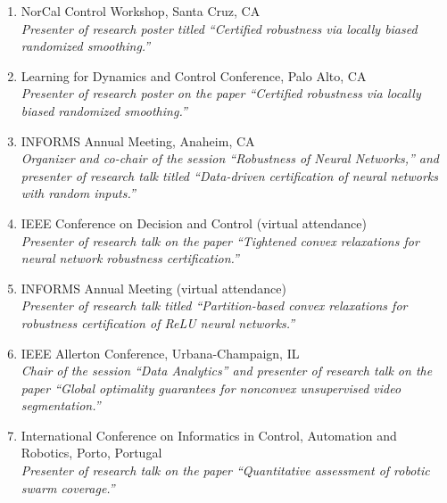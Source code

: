 \begin{enumerate}[label={\arabic*.}]
	\item NorCal Control Workshop, Santa Cruz, CA  \\
	\textit{Presenter of research poster titled ``Certified robustness via locally biased randomized smoothing.''}
	\item Learning for Dynamics and Control Conference, Palo Alto, CA  \\
	\textit{Presenter of research poster on the paper ``Certified robustness via locally biased randomized smoothing.''}
	\item INFORMS Annual Meeting, Anaheim, CA  \\
	\textit{Organizer and co-chair of the session ``Robustness of Neural Networks,'' and presenter of research talk titled ``Data-driven certification of neural networks with random inputs.''}
	\item IEEE Conference on Decision and Control (virtual attendance)  \\
	\textit{Presenter of research talk on the paper ``Tightened convex relaxations for neural network robustness certification.''}
	\item INFORMS Annual Meeting (virtual attendance)  \\
	\textit{Presenter of research talk titled ``Partition-based convex relaxations for robustness certification of ReLU neural networks.''}
	\item IEEE Allerton Conference, Urbana-Champaign, IL  \\
	\textit{Chair of the session ``Data Analytics'' and presenter of research talk on the paper ``Global optimality guarantees for nonconvex unsupervised video segmentation.''}
	\item International Conference on Informatics in Control, Automation and Robotics, Porto, Portugal  \\
	\textit{Presenter of research talk on the paper ``Quantitative assessment of robotic swarm coverage.''}
\end{enumerate}
